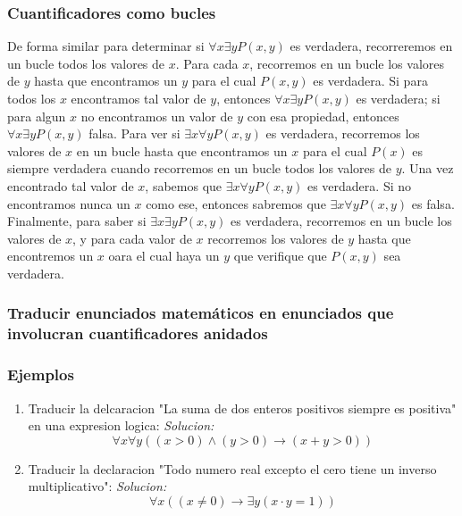\documentclass[]{article}
\begin{document}
\subsubsection*{Cuantificadores como bucles}

De forma similar para determinar si $\forall{x}\exists{y}P(x, y)$ es verdadera, recorreremos en un bucle todos los valores de $x$. Para cada $x$, recorremos en un bucle los valores de $y$ hasta que encontramos un $y$ para el cual $P(x, y)$ es verdadera. Si para todos los $x$ encontramos tal valor de $y$, entonces $\forall{x}\exists{y}P(x, y)$ es verdadera; si para algun $x$ no encontramos un valor de $y$ con esa propiedad, entonces $\forall{x}\exists{y}P(x, y)$ falsa.
Para ver si $\exists{x}\forall{y}P(x, y)$ es verdadera, recorremos los valores de $x$ en un bucle hasta que encontramos un $x$ para el cual $P(x)$ es siempre verdadera cuando recorremos en un bucle todos los valores de $y$. Una vez encontrado tal valor de $x$, sabemos que $\exists{x}\forall{y}P(x, y)$ es verdadera. Si no encontramos nunca un $x$ como ese, entonces sabremos que $\exists{x}\forall{y}P(x, y)$ es falsa.
Finalmente, para saber si $\exists{x}\exists{y}P(x, y)$ es verdadera, recorremos en un bucle los valores de $x$, y para cada valor de $x$ recorremos los valores de $y$ hasta que encontremos un $x$ oara el cual haya un $y$ que verifique que $P(x, y)$ sea verdadera.

\subsubsection*{Traducir enunciados matemáticos en enunciados que involucran cuantificadores anidados}

\subsubsection*{Ejemplos}

\begin{enumerate}
	\item Traducir la delcaracion "La suma de dos enteros positivos siempre es positiva" en una expresion logica:
	\textit{Solucion:}
	\begin{equation*}
		\forall x \forall y ((x > 0) \wedge (y > 0) \rightarrow (x + y > 0))
	\end{equation*}

	\item Traducir la declaracion "Todo numero real excepto el cero tiene un inverso multiplicativo":
	\textit{Solucion:}
	\begin{equation*}
		\forall x ((x \neq 0) \rightarrow \exists y(x\cdot y = 1))
	\end{equation*}
\end{enumerate}
\end{document}
